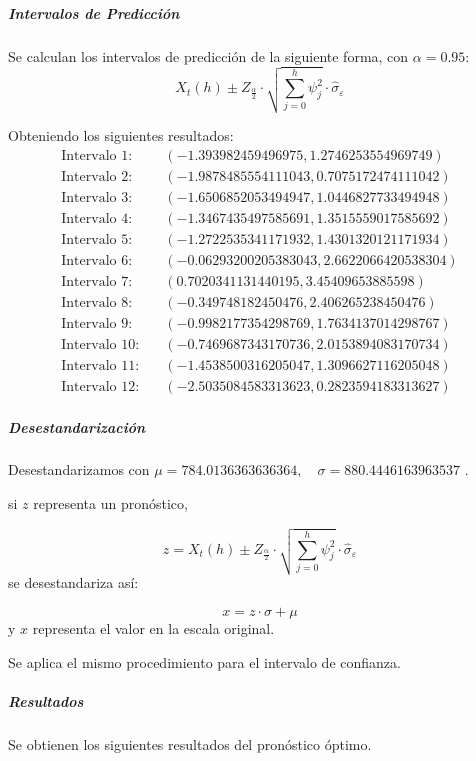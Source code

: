 \documentclass[12pt,letterpaper]{article}   %
\begin{document}
  


    
    \subparagraph{Intervalos de Predicción}

Se calculan los intervalos de predicción de la siguiente forma, con $\alpha=0.95$:
    \[
X_t(h) \pm Z_{\frac{\alpha}{2}} \cdot \sqrt{ \sum_{j=0}^{h} \psi_j^2 } \cdot \hat{\sigma}_\varepsilon
\]

Obteniendo los siguientes resultados:
\begin{align*}
\text{Intervalo 1:} &\quad (-1.393982459496975, 1.2746253554969749) \\
\text{Intervalo 2:} &\quad (-1.9878485554111043, 0.7075172474111042) \\
\text{Intervalo 3:} &\quad (-1.6506852053494947, 1.0446827733494948) \\
\text{Intervalo 4:} &\quad (-1.3467435497585691, 1.3515559017585692) \\
\text{Intervalo 5:} &\quad (-1.2722535341171932, 1.4301320121171934) \\
\text{Intervalo 6:} &\quad (-0.06293200205383043, 2.6622066420538304) \\
\text{Intervalo 7:} &\quad (0.7020341131440195, 3.45409653885598) \\
\text{Intervalo 8:} &\quad (-0.349748182450476, 2.406265238450476) \\
\text{Intervalo 9:} &\quad (-0.9982177354298769, 1.7634137014298767) \\
\text{Intervalo 10:} &\quad (-0.7469687343170736, 2.0153894083170734) \\
\text{Intervalo 11:} &\quad (-1.4538500316205047, 1.3096627116205048) \\
\text{Intervalo 12:} &\quad (-2.5035084583313623, 0.2823594183313627)
\end{align*}

\subparagraph{Desestandarización}

Desestandarizamos con $\mu = 784.0136363636364, \quad\sigma= 880.4446163963537$ .

si \(z\) representa un pronóstico,

\[
z = X_t(h) \pm Z_{\frac{\alpha}{2}} \cdot \sqrt{ \sum_{j=0}^{h} \psi_j^2 } \cdot \hat{\sigma}_\varepsilon
\]
se desestandariza así:

\[
x = z \cdot \sigma + \mu
\]
y \( x \) representa el valor en la escala original. 

Se aplica el mismo procedimiento para el intervalo de confianza.

\newpage
\subparagraph{Resultados}
Se obtienen los siguientes resultados del pronóstico óptimo.
\end{document}
